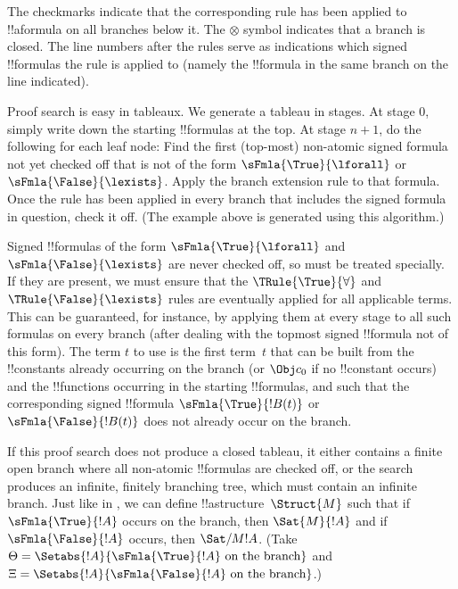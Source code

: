 \documentclass[../../../include/open-logic-section]{subfiles}
\begin{document}
The checkmarks indicate that the corresponding rule has been applied
to !!a{formula} on all branches below it. The $\otimes$ symbol
indicates that a branch is closed. The line numbers after the rules
serve as indications which signed !!{formula}s the rule is applied to
(namely the !!{formula} in the same branch on the line indicated).

Proof search is easy in tableaux. We generate a tableau in stages. At
stage $0$, simply write down the starting !!{formula}s at the top. At
stage $n+1$, do the following for each leaf node: Find the first
(top-most) non-atomic signed formula not yet checked off that is not of the form $\sFmla{\True}{\lforall}$ or $\sFmla{\False}{\lexists}$. Apply the branch
extension rule to that formula. Once the rule has been applied in
every branch that includes the signed formula in question, check it
off. (The example above is generated using this algorithm.)

Signed !!{formula}s of the form $\sFmla{\True}{\lforall}$ and
$\sFmla{\False}{\lexists}$ are never checked off, so must be treated
specially. If they are present, we must ensure that the
$\TRule{\True}{\forall}$ and $\TRule{\False}{\lexists}$ rules are
eventually applied for all applicable terms. This can be guaranteed,
for instance, by applying them at every stage to all such formulas on
every branch (after dealing with the topmost signed !!{formula} not of
this form). The term $t$ to use is the first term~$t$ that can be
built from the !!{constant}s already occurring on the branch (or $\Obj
c_0$ if no !!{constant} occurs) and the !!{function}s occurring in the
starting !!{formula}s, and such that the corresponding signed
!!{formula} $\sFmla{\True}{!B(t)}$ or~$\sFmla{\False}{!B(t)}$ does not
already occur on the branch.

If this proof search does not produce a closed tableau, it either
contains a finite open branch where all non-atomic !!{formula}s are
checked off, or the search produces an infinite, finitely branching
tree, which must contain an infinite branch. Just like in
, we can define !!a{structure}~$\Struct{M}$ such that
if $\sFmla{\True}{!A}$ occurs on the branch, then $\Sat{M}{!A}$ and if
$\sFmla{\False}{!A}$ occurs, then $\Sat/{M}{!A}$. (Take $\Theta =
\Setabs{!A}{\sFmla{\True}{!A} \text{ on the branch}}$ and $\Xi =
\Setabs{!A}{\sFmla{\False}{!A} \text{ on the branch}}$.)
\end{document}
